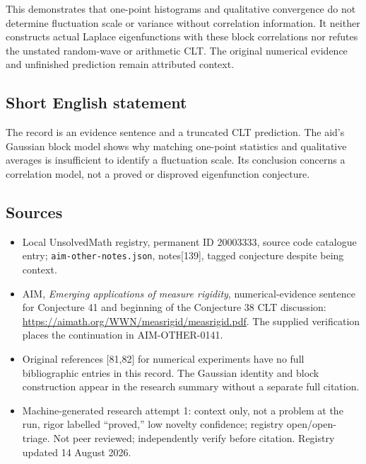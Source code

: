 \documentclass[11pt]{article}
\begin{document}
This demonstrates that one-point histograms and qualitative convergence do not determine fluctuation scale or variance without correlation information. It neither constructs actual Laplace eigenfunctions with these block correlations nor refutes the unstated random-wave or arithmetic CLT. The original numerical evidence and unfinished prediction remain attributed context.
\subsection{Short English statement}
The record is an evidence sentence and a truncated CLT prediction. The aid’s Gaussian block model shows why matching one-point statistics and qualitative averages is insufficient to identify a fluctuation scale. Its conclusion concerns a correlation model, not a proved or disproved eigenfunction conjecture.
\subsection{Sources}
\begin{itemize}
\item Local UnsolvedMath registry, permanent ID 20003333, source code catalogue entry; \texttt{aim-other-notes.json}, notes[139], tagged conjecture despite being context.
\item AIM, \emph{Emerging applications of measure rigidity}, numerical-evidence sentence for Conjecture 41 and beginning of the Conjecture 38 CLT discussion: \url{https://aimath.org/WWN/measrigid/measrigid.pdf}. The supplied verification places the continuation in AIM-OTHER-0141.
\item Original references [81,82] for numerical experiments have no full bibliographic entries in this record. The Gaussian identity and block construction appear in the research summary without a separate full citation.
\item Machine-generated research attempt 1: context only, not a problem at the run, rigor labelled ``proved,'' low novelty confidence; registry open/open-triage. Not peer reviewed; independently verify before citation. Registry updated 14 August 2026.
\end{itemize}
\end{document}
